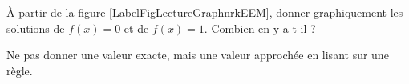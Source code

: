 
\begin{exercice}\label{exoSeconde-0047}

    À partir de la figure \ref{LabelFigLectureGraphnrkEEM}, donner graphiquement les solutions de \( f(x)=0\) et de  \( f(x)=1\). Combien en y a-t-il ?
\newcommand{\CaptionFigLectureGraphnrkEEM}{Dessiner les soutions de \( f(x)=1\).}


Ne pas donner une valeur exacte, mais une valeur approchée en lisant sur une règle.

\end{exercice}
